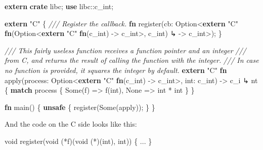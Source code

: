 \documentclass[a4paper,]{book}
\newenvironment{Shaded}{\begin{snugshade}}{\end{snugshade}}
\newcommand{\KeywordTok}[1]{\textcolor[rgb]{0.13,0.29,0.53}{\textbf{{#1}}}}
\newcommand{\DataTypeTok}[1]{\textcolor[rgb]{0.13,0.29,0.53}{{#1}}}
\newcommand{\ConstantTok}[1]{\textcolor[rgb]{0.00,0.00,0.00}{{#1}}}
\newcommand{\StringTok}[1]{\textcolor[rgb]{0.31,0.60,0.02}{{#1}}}
\newcommand{\CommentTok}[1]{\textcolor[rgb]{0.56,0.35,0.01}{\textit{{#1}}}}
\newcommand{\NormalTok}[1]{{#1}}
\begin{document}
\begin{Shaded}
\begin{Highlighting}[]
\KeywordTok{extern} \KeywordTok{crate} \NormalTok{libc;}
\KeywordTok{use} \NormalTok{libc::}\DataTypeTok{c_int}\NormalTok{;}

\KeywordTok{extern} \StringTok{"C"} \NormalTok{\{}
    \CommentTok{/// Register the callback.}
    \KeywordTok{fn} \NormalTok{register(cb: }\DataTypeTok{Option}\NormalTok{<}\KeywordTok{extern} \StringTok{"C"} \KeywordTok{fn}\NormalTok{(}\DataTypeTok{Option}\NormalTok{<}\KeywordTok{extern} \StringTok{"C"} \KeywordTok{fn}\NormalTok{(}\DataTypeTok{c_int}\NormalTok{) -> }\DataTypeTok{c_int}\NormalTok{>, }\DataTypeTok{c_int}\NormalTok{)}
\NormalTok{↳  -> }\DataTypeTok{c_int}\NormalTok{>);}
\NormalTok{\}}

\CommentTok{/// This fairly useless function receives a function pointer and an integer}
\CommentTok{/// from C, and returns the result of calling the function with the integer.}
\CommentTok{/// In case no function is provided, it squares the integer by default.}
\KeywordTok{extern} \StringTok{"C"} \KeywordTok{fn} \NormalTok{apply(process: }\DataTypeTok{Option}\NormalTok{<}\KeywordTok{extern} \StringTok{"C"} \KeywordTok{fn}\NormalTok{(}\DataTypeTok{c_int}\NormalTok{) -> }\DataTypeTok{c_int}\NormalTok{>, }\DataTypeTok{int}\NormalTok{: }\DataTypeTok{c_int}\NormalTok{) -> c_i}
\NormalTok{↳ nt \{}
    \KeywordTok{match} \NormalTok{process \{}
        \ConstantTok{Some}\NormalTok{(f) => f(}\DataTypeTok{int}\NormalTok{),}
        \ConstantTok{None}    \NormalTok{=> }\DataTypeTok{int} \NormalTok{* }\DataTypeTok{int}
    \NormalTok{\}}
\NormalTok{\}}

\KeywordTok{fn} \NormalTok{main() \{}
    \KeywordTok{unsafe} \NormalTok{\{}
        \NormalTok{register(}\ConstantTok{Some}\NormalTok{(apply));}
    \NormalTok{\}}
\NormalTok{\}}
\end{Highlighting}
\end{Shaded}

And the code on the C side looks like this:

\begin{Shaded}
\begin{Highlighting}[]
\DataTypeTok{void} \DataTypeTok{register}\NormalTok{(}\DataTypeTok{void} \NormalTok{(*f)(}\DataTypeTok{void} \NormalTok{(*)(}\DataTypeTok{int}\NormalTok{), }\DataTypeTok{int}\NormalTok{)) \{}
    \NormalTok{...}
\NormalTok{\}}
\end{Highlighting}
\end{Shaded}
\end{document}

